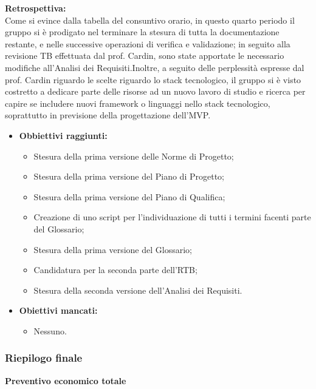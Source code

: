 \textbf{Retrospettiva:} \\
Come si evince dalla tabella del consuntivo orario, in questo quarto periodo il gruppo si è prodigato nel terminare la stesura di tutta la documentazione restante,
e nelle successive operazioni di verifica e validazione; in seguito alla revisione TB effettuata dal prof. Cardin, sono state apportate le necessario modifiche all'Analisi
dei Requisiti.Inoltre, a seguito delle perplessità espresse dal prof. Cardin riguardo le scelte riguardo lo stack tecnologico, il gruppo si è visto costretto a dedicare parte delle risorse ad
un nuovo lavoro di studio e ricerca per capire se includere nuovi framework o linguaggi nello stack tecnologico, soprattutto in previsione della progettazione dell'MVP.
\begin{itemize}
    \item \textbf{Obbiettivi raggiunti:}
    \begin{itemize}
        \item Stesura della prima versione delle Norme di Progetto;
        \item Stesura della prima versione del Piano di Progetto;
        \item Stesura della prima versione del Piano di Qualifica;
        \item Creazione di uno script per l'individuazione di tutti i termini facenti parte del Glossario;
        \item Stesura della prima versione del Glossario;
        \item Candidatura per la seconda parte dell'RTB;
        \item Stesura della seconda versione dell'Analisi dei Requisiti.
    \end{itemize}
    \item \textbf{Obiettivi mancati:}
    \begin{itemize}
        \item Nessuno.
    \end{itemize}
\end{itemize}

\subsubsection{Riepilogo finale}
\textbf{Preventivo economico totale}


